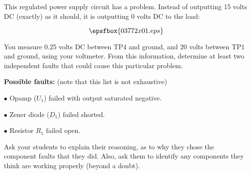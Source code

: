 

This regulated power supply circuit has a problem.  Instead of outputting 15 volts DC (exactly) as it should, it is outputting 0 volts DC to the load:

$$\epsfbox{03772x01.eps}$$

You measure 0.25 volts DC between TP4 and ground, and 20 volts between TP1 and ground, using your voltmeter.  From this information, determine at least two independent faults that could cause this particular problem.







\noindent
{\bf Possible faults:} (note that this list is not exhaustive)

\medskip
\item{$\bullet$} Opamp ($U_1$) failed with output saturated negative.
\item{$\bullet$} Zener diode ($D_1$) failed shorted.
\item{$\bullet$} Resistor $R_1$ failed open.
\medskip







Ask your students to explain their reasoning, as to why they chose the component faults that they did.  Also, ask them to identify any components they think are working properly (beyond a doubt).




